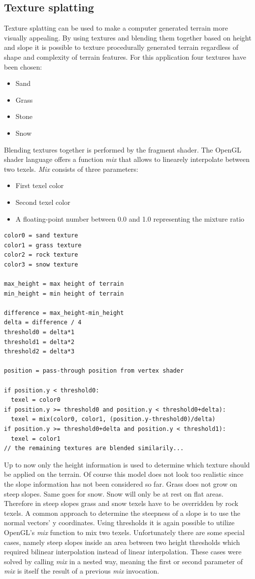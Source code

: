 \documentclass[11pt,a4paper,twoside,openright]{report}
\begin{document}
\subsection{Texture splatting}
Texture splatting can be used to make a computer generated terrain more visually appealing. By using textures and blending them together based on height and slope it is possible to texture procedurally generated terrain regardless of shape and complexity of terrain features. For this application four textures have been chosen:
\begin{itemize}
\item Sand
\item Grass
\item Stone
\item Snow
\end{itemize}
Blending textures together is performed by the fragment shader. The OpenGL shader language offers a function \emph{mix} that allows to linearely interpolate between two texels. \emph{Mix} consists of three parameters:
\begin{itemize}
\item First texel color
\item Second texel color
\item A floating-point number between 0.0 and 1.0 representing the mixture ratio
\end{itemize}
\begin{lstlisting}[caption=Fragment shader texture chooser pseudocode]
color0 = sand texture
color1 = grass texture
color2 = rock texture
color3 = snow texture

max_height = max height of terrain
min_height = min height of terrain

difference = max_height-min_height
delta = difference / 4
threshold0 = delta*1
threshold1 = delta*2
threshold2 = delta*3

position = pass-through position from vertex shader

if position.y < threshold0:
  texel = color0
if position.y >= threshold0 and position.y < threshold0+delta):
  texel = mix(color0, color1, (position.y-threshold0)/delta)
if position.y >= threshold0+delta and position.y < threshold1):
  texel = color1
// the remaining textures are blended similarily...
\end{lstlisting}
Up to now only the height information is used to determine which texture should be applied on the terrain. Of course this model does not look too realistic since the slope information has not been considered so far. Grass does not grow on steep slopes. Same goes for snow. Snow will only be at rest on flat areas. Therefore in steep slopes grass and snow texels have to be overridden by rock texels. A common approach to determine the steepness of a slope is to use the normal vectors' y coordinates. Using thresholds it is again possible to utilize OpenGL's \emph{mix} function to mix two texels. Unfortunately there are some special cases, namely steep slopes inside an area between two height thresholds which required bilinear interpolation instead of linear interpolation. These cases were solved by calling \emph{mix} in a nested way, meaning the first or second parameter of \emph{mix} is itself the result of a previous \emph{mix} invocation.
\end{document}
